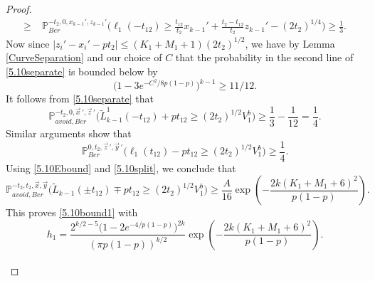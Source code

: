\begin{proof}
\begin{equation}
\begin{split}
	\geq \; & \mathbb{P}^{-t_2,0,x_{k-1}',z_{k-1}'}_{Ber}\Big(\ell_1(-t_{12}) \geq \frac{t_{12}}{t_2}x_{k-1}' + \frac{t_2-t_{12}}{t_2}z_{k-1}' - (2t_2)^{1/4}\Big) \geq \frac{1}{3}.
	\end{split}
	\end{equation}
	Now since $|z_i'-x_i'-pt_2| \leq (K_1+M_1+1)(2t_2)^{1/2}$, we have by Lemma \ref{CurveSeparation} and our choice of $C$ that the probability in the second line of \eqref{5.10separate} is bounded below by
	\[
	\big(1-3e^{-C^2/8p(1-p)}\big)^{k-1} \geq 11/12.
	\]
	It follows from \eqref{5.10separate} that
	\begin{equation}\label{5.10left}
	\mathbb{P}^{-t_2,0,\vec{x}\,',\vec{z}\,'}_{avoid,Ber}\Big(\tilde{L}^1_{k-1}(-t_{12}) + pt_{12} \geq (2t_2)^{1/2}V_1^b\Big) \geq \frac{1}{3} - \frac{1}{12} = \frac{1}{4}.
	\end{equation}
	Similar arguments show that
	\begin{equation}\label{5.10right}
	\mathbb{P}^{0,t_2,\vec{z}\,',\vec{y}\,'}_{Ber}\Big(\ell_1(t_{12}) - pt_{12} \geq (2t_2)^{1/2}V_1^b\Big) \geq \frac{1}{4}.
	\end{equation}
	Using \eqref{5.10Ebound} and \eqref{5.10split}, we conclude that
	\[
	\mathbb{P}^{-t_2,t_2,\vec{x},\vec{y}}_{avoid, Ber}\Big(\tilde{L}_{k-1}(\pm t_{12}) \mp pt_{12} \geq (2t_2)^{1/2}V_1^b\Big) \geq \frac{A}{16}\exp\left(-\frac{2k(K_1+M_1+6)^2}{p(1-p)}\right).
	\]
	This proves \eqref{5.10bound1} with
	\[
	h_1 = \frac{2^{k/2-5}\big(1-2e^{-4/p(1-p)}\big)^{2k}}{(\pi p(1-p))^{k/2}}\exp\left(-\frac{2k(K_1+M_1+6)^2}{p(1-p)}\right).
	\]\\
	

\end{proof}
